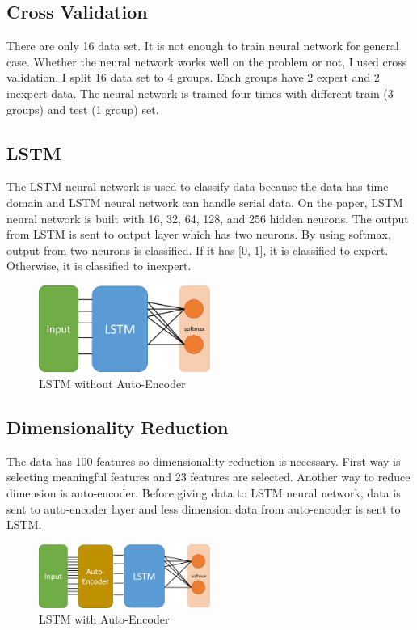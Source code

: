 \documentclass[12pt]{article}
\begin{document}
\subsection{Cross Validation}
There are only 16 data set. It is not enough to train neural network for general case. Whether the neural network works well on the problem or not, I used cross validation. I split 16 data set to 4 groups. Each groups have 2 expert and 2 inexpert data. The neural network is trained four times with different train (3 groups) and test (1 group) set. 

\subsection{LSTM}
The LSTM neural network is used to classify data because the data has time domain and LSTM neural network can handle serial data. On the paper, LSTM neural network is built with 16, 32, 64, 128, and 256 hidden neurons. The output from LSTM is sent to output layer which has two neurons. By using softmax, output from two neurons is classified. If it has [0, 1], it is classified to expert. Otherwise, it is classified to inexpert.

\begin{figure}[H]
    \centering
    \includegraphics[width=0.5\textwidth]{pictures/applied_lstm.png}
    \caption{LSTM without Auto-Encoder}
    \label{fig:Applied LSTM}
\end{figure}

\subsection{Dimensionality Reduction}
The data has 100 features so dimensionality reduction is necessary. First way is selecting meaningful features and 23 features are selected. Another way to reduce dimension is auto-encoder. Before giving data to LSTM neural network, data is sent to auto-encoder layer and less dimension data from auto-encoder is sent to LSTM. 

\begin{figure}[H]
    \centering
    \includegraphics[width=0.5\textwidth]{pictures/applied_lstm_autoencoder.png}
    \caption{LSTM with Auto-Encoder}
    \label{fig:Applied LSTM With Auto-Encoder}
\end{figure}
\end{document}
